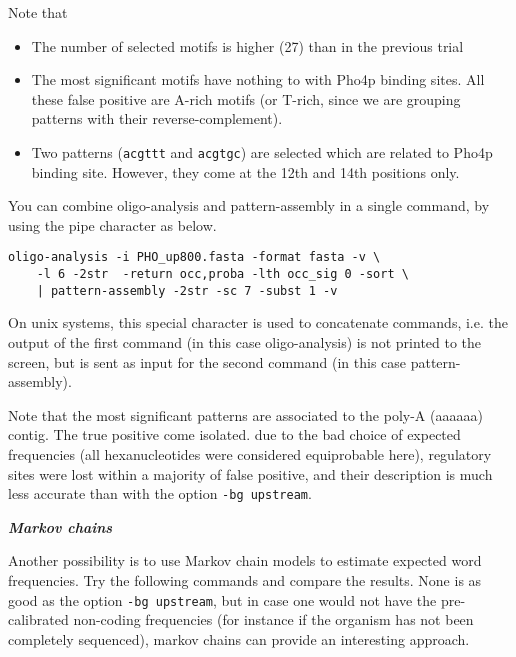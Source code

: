 Note that
\begin{itemize} 
\item The number of selected motifs is higher (27) than in the previous trial
\item The most significant motifs have nothing to with Pho4p binding
sites. All these false positive are A-rich motifs (or T-rich, since we
are grouping patterns with their reverse-complement).
\item Two patterns (\texttt{acgttt} and \texttt{acgtgc}) are selected
which are related to Pho4p binding site. However, they come at the
12th and 14th positions only.
\end{itemize}

You can combine oligo-analysis and pattern-assembly in a single
command, by using the pipe character as below.

\begin{verbatim}
oligo-analysis -i PHO_up800.fasta -format fasta -v \
    -l 6 -2str  -return occ,proba -lth occ_sig 0 -sort \
    | pattern-assembly -2str -sc 7 -subst 1 -v
\end{verbatim}

On unix systems, this special character is used to concatenate
commands, i.e. the output of the first command (in this case
oligo-analysis) is not printed to the screen, but is sent as input for
the second command (in this case pattern-assembly).

Note that the most significant patterns are associated to the poly-A
(aaaaaa) contig. The true positive come isolated. due to the bad
choice of expected frequencies (all hexanucleotides were considered
equiprobable here), regulatory sites were lost within a majority of
false positive, and their description is much less accurate than with
the option \texttt{-bg upstream}.

\textit{\textbf{Markov chains}}

Another possibility is to use Markov chain models to estimate expected
word frequencies. Try the following commands and compare the
results. None is as good as the option \texttt{-bg upstream},
but in case one would not have the pre-calibrated non-coding
frequencies (for instance if the organism has not been completely
sequenced), markov chains can provide an interesting approach.

